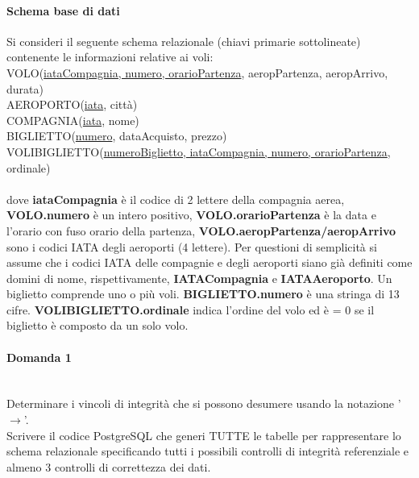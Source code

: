 \documentclass[a4paper, 10pt, titlepage]{article}
\begin{document}
\paragraph{Schema base di dati}
Si consideri il seguente schema relazionale (chiavi primarie sottolineate) contenente le informazioni relative ai voli: \medskip \\
VOLO(\underline{iataCompagnia, numero, orarioPartenza}, aeropPartenza, aeropArrivo, durata)\\
AEROPORTO(\underline{iata}, città)\\
COMPAGNIA(\underline{iata}, nome)\\
BIGLIETTO(\underline{numero}, dataAcquisto, prezzo)\\
VOLIBIGLIETTO(\underline{numeroBiglietto, iataCompagnia, numero, orarioPartenza}, ordinale)\\
\\
dove \textbf{iataCompagnia} è il codice di 2 lettere della compagnia aerea, \textbf{VOLO.numero} è un intero positivo, \textbf{VOLO.orarioPartenza} è la data e l'orario con fuso orario della partenza, \textbf{VOLO.aeropPartenza/aeropArrivo} sono i codici IATA degli aeroporti (4 lettere). Per questioni di semplicità si assume che i codici IATA delle compagnie e degli aeroporti siano già definiti come domini di nome, rispettivamente, \textbf{IATACompagnia} e \textbf{IATAAeroporto}. Un biglietto comprende uno o più voli. \textbf{BIGLIETTO.numero} è una stringa di 13 cifre. \textbf{VOLIBIGLIETTO.ordinale} indica l'ordine del volo ed è = 0 se il biglietto è composto da un solo volo.
\paragraph{Domanda 1}\dotfill 
\\Determinare i vincoli di integrità che si possono desumere usando la notazione '$\rightarrow$'.\\
Scrivere il codice PostgreSQL che generi TUTTE le tabelle per rappresentare lo schema relazionale specificando tutti i possibili controlli di integrità referenziale e almeno 3 controlli di correttezza dei dati.
\end{document}
